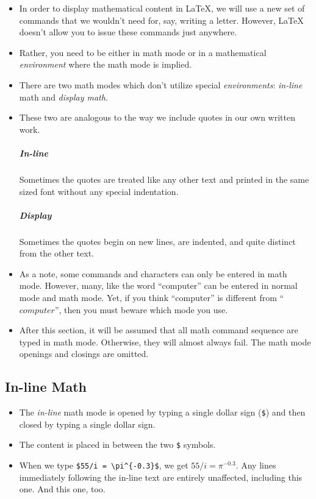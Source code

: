 \begin{itemize}
  
\item In order to display mathematical content in \LaTeX{}, we will use a
  new set of commands that we wouldn't need for, say, writing a
  letter. However, \LaTeX{} doesn't allow you to issue these commands
  just anywhere. 

\item Rather, you need to be either in math mode or in a
  mathematical \textit{environment} where the math mode is implied.

\item There are two math modes which don't utilize special
  \textit{environments}: \textit{in-line} math and \textit{display
    math}.

\item These two are analogous to the way we include quotes in our own
  written work. \subparagraph{In-line} Sometimes the quotes are
  treated like any other text and printed in the same sized font
  without any special indentation. \subparagraph{Display} Sometimes
  the quotes begin on new lines, are indented, and quite distinct from
  the other text.

\item As a note, some commands and characters can only be entered in
  math mode. However, many, like the word ``computer'' can be entered
  in normal mode and math mode. Yet, if you think ``computer'' is
  different from ``$computer$'', then you must beware which mode you
  use.

\item After this section, it will be assumed that all math command
  sequence are typed in math mode. Otherwise, they will almost always
  fail. The math mode openings and closings are omitted.
  
\end{itemize}

\subsection*{In-line Math}
\begin{itemize}
\item The \textit{in-line} math mode is opened by typing a single
  dollar sign (\texttt{\$}) and then closed by typing a single dollar
  sign.
\item The content is placed in between the two \texttt{\$} symbols.
\item When we type \texttt{\$55/i = \textbackslash pi\^{}\{-0.3\}\$},
  we get $55/i = \pi^{-0.3}$. Any lines immediately following the
  in-line text are entirely unaffected, including this one. And
  this one, too.
\end{itemize}

